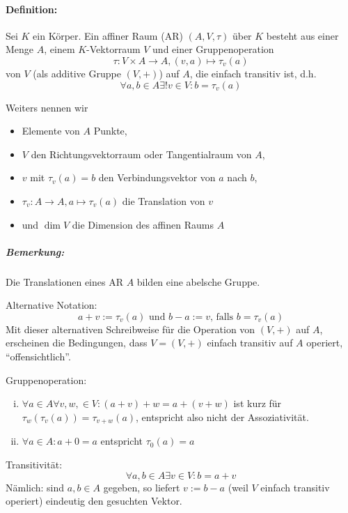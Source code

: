 \paragraph{Definition: }
	Sei $ K $ ein Körper. Ein affiner Raum (AR) $ (A,V,\tau) $ über $ K $ besteht aus einer Menge $ A $, einem $ K $-Vektorraum $ V $ und einer Gruppenoperation
		\[ \tau:V\times A\to A,(v,a)\mapsto \tau_v(a) \]
	von $ V $ (als additive Gruppe $ (V,+) $) auf $ A $, die einfach transitiv ist, d.h.
		\[ \forall a,b\in A\exists!v\in V:b=\tau_v(a) \]
\begin{figure}\centering
{}
\end{figure}

	Weiters nennen wir
		\begin{itemize}
			\item Elemente von $ A $ Punkte,
			\item $ V $ den Richtungsvektorraum oder Tangentialraum von $ A $,
			\item $ v $ mit $ \tau_v(a)=b $ den Verbindungsvektor von $ a $ nach $ b $,
			\item $ \tau_v:A\to A, a\mapsto \tau_v(a) $ die Translation von $ v $
			\item und $ \dim V $ die Dimension des affinen Raums $ A $
		\end{itemize}
		
\subparagraph{Bemerkung: }
	Die Translationen eines AR $ A $ bilden eine abelsche Gruppe.
	
	Alternative Notation:
		\[ a+v:=\tau_v(a) \text{ und } b-a:= v\text{, falls } b=\tau_v(a) \]
	Mit dieser alternativen Schreibweise für die Operation von $ (V,+) $ auf $ A $, erscheinen die Bedingungen, dass $ V=(V,+) $ einfach transitiv auf $ A $ operiert, "`offensichtlich"'.
	
	Gruppenoperation:
		\begin{enumerate}[(i)]
			\item $ \forall a\in A\forall v,w,\in V: (a+v)+w = a+(v+w) $ ist kurz für $ \tau_w(\tau_v(a)) = \tau_{v+w}(a) $, entspricht also nicht der Assoziativität.
			\item $ \forall a\in A:a+0=a $ entspricht $ \tau_0(a) = a $
		\end{enumerate}
	Transitivität:
		\[ \forall a,b\in A\exists v\in V: b=a+v \]
	Nämlich: sind $ a,b\in A $ gegeben, so liefert $ v:=b-a $ (weil $ V $ einfach transitiv operiert) eindeutig den gesuchten Vektor.

